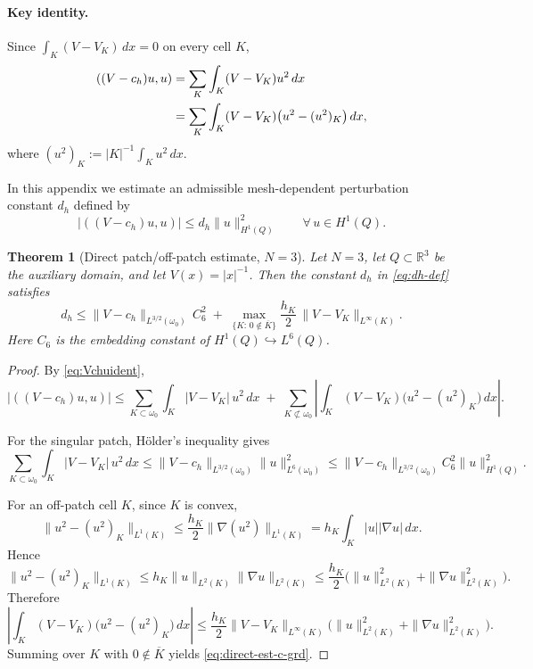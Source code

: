 \documentclass[11pt]{article}
\theoremstyle{plain}
\newtheorem{theorem}{Theorem}
\theoremstyle{definition}
\theoremstyle{remark}
\begin{document}
\paragraph{Key identity.}
Since $\int_K (V-V_K)\,dx=0$ on every cell $K$,
\begin{align}
((V-c_h)u,u)
&=\sum_{K}\int_K (V-V_K)u^2\,dx \notag\\
&=\sum_K \int_K (V-V_K)\bigl(u^2-(u^2)_K\bigr)\,dx,
\label{eq:Vchuident}
\end{align}
where $(u^2)_K:=|K|^{-1}\int_K u^2\,dx$.

In this appendix we estimate an admissible mesh-dependent perturbation
constant $d_h$ defined by
\begin{equation}
|((V-c_h)u,u)| \le d_h \|u\|_{H^1(Q)}^2
\qquad \forall\,u\in H^1(Q).
\label{eq:dh-def}
\end{equation}

\begin{theorem}[Direct patch/off-patch estimate, $N=3$]
\label{thm:graded-eps}
Let $N=3$, let $Q\subset \mathbb R^3$ be the auxiliary domain, and let
$V(x)=|x|^{-1}$. Then the constant $d_h$ in \eqref{eq:dh-def} satisfies
\begin{equation}
d_h
\le
\|V-c_h\|_{L^{3/2}(\omega_0)}\,C_6^2
\;+\;
\max_{\{K:\,0\notin \overline K\}}
\frac{h_K}{2}\,\|V-V_K\|_{L^\infty(K)}.
\label{eq:direct-est-c-grd}
\end{equation}
Here $C_6$ is the embedding constant of
$H^1(Q)\hookrightarrow L^6(Q)$.
\end{theorem}

\begin{proof}
By \eqref{eq:Vchuident},
\[
|((V-c_h)u,u)|
\le
\sum_{K\subset \omega_0}\int_K |V-V_K|\,u^2\,dx
\;+\;
\sum_{K\not\subset \omega_0}
\left|\int_K (V-V_K)\bigl(u^2-(u^2)_K\bigr)\,dx\right|.
\]

For the singular patch, Hölder's inequality gives
\[
\sum_{K\subset \omega_0}\int_K |V-V_K|\,u^2\,dx
\le
\|V-c_h\|_{L^{3/2}(\omega_0)} \|u\|_{L^6(\omega_0)}^2
\le
\|V-c_h\|_{L^{3/2}(\omega_0)} C_6^2 \|u\|_{H^1(Q)}^2.
\]

For an off-patch cell $K$, since $K$ is convex,
\[
\|u^2-(u^2)_K\|_{L^1(K)}
\le
\frac{h_K}{2}\|\nabla(u^2)\|_{L^1(K)}
=
h_K\int_K |u||\nabla u|\,dx.
\]
Hence
\[
\|u^2-(u^2)_K\|_{L^1(K)}
\le
h_K \|u\|_{L^2(K)}\|\nabla u\|_{L^2(K)}
\le
\frac{h_K}{2}\bigl(\|u\|_{L^2(K)}^2+\|\nabla u\|_{L^2(K)}^2\bigr).
\]
Therefore
\[
\left|\int_K (V-V_K)\bigl(u^2-(u^2)_K\bigr)\,dx\right|
\le
\frac{h_K}{2}\|V-V_K\|_{L^\infty(K)}
\bigl(\|u\|_{L^2(K)}^2+\|\nabla u\|_{L^2(K)}^2\bigr).
\]
Summing over $K$ with $0\notin \overline K$ yields \eqref{eq:direct-est-c-grd}.
\end{proof}
\end{document}
